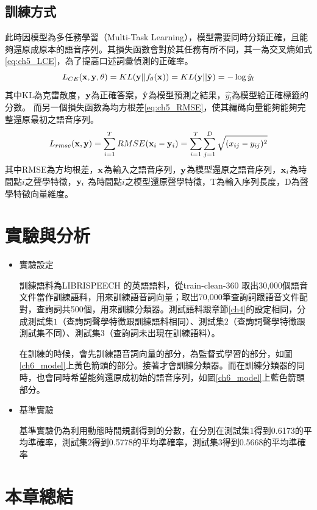\subsection{訓練方式}
此時因模型為多任務學習（Multi-Task
Learning），模型需要同時分類正確，且能夠還原成原本的語音序列。其損失函數會對於其任務有所不同，其一為交叉熵如式\ref{eq:ch5_LCE}，為了提高口述詞彙偵測的正確率。
\begin{equation}
\label{eq:ch5_LCE}
L_{CE}(\bold{x} , \bold{y} , \theta) =KL(\bold{y} || f_{\theta}(\bold{x}))= KL( \bold{y} ||\hat{\bold {y}} )  = - \log \hat{y}_{l} 
\end{equation}
其中KL為克雷散度，$\bold{y}$為正確答案，$\hat{\bold{y}}$為模型預測之結果，$\hat{y_l}$為模型給正確標籤的分數。
而另一個損失函數為均方根差\ref{eq:ch5_RMSE}，使其編碼向量能夠能夠完整還原最初之語音序列。
\begin{equation}
\label{eq:ch5_RMSE}
L_{rmse} (\bold{x},\bold{y}) = \sum_{i=1}^{T}
RMSE(\bold{x}_i-\bold{y}_i) = \sum_{i=1}^{T} \sum_{j=1}^D \sqrt{(x_{ij}-y_{ij})^2}
\end{equation}
其中RMSE為方均根差，$\bold{x}$為輸入之語音序列，$\bold{y}$為模型還原之語音序列，$\bold{x}_i$為時間點$i$之聲學特徵，$\bold{y}_i$
為時間點$i$之模型還原聲學特徵，T為輸入序列長度，D為聲學特徵向量維度。
\section{實驗與分析}
\begin{itemize}
\item{實驗設定}

	訓練語料為LIBRISPEECH 的英語語料，從train-clean-360
	取出30,000個語音文件當作訓練語料，用來訓練語音詞向量；取出70,000筆查詢詞跟語音文件配對，查詢詞共500個，用來訓練分類器。測試語料跟章節\ref{ch4}的設定相同，分成測試集$1$（查詢詞聲學特徵跟訓練語料相同）、測試集$2$（查詢詞聲學特徵跟測試集不同）、測試集$3$（查詢詞未出現在訓練語料）。
	
	在訓練的時候，會先訓練語音詞向量的部分，為監督式學習的部分，如圖\ref{ch6_model}上黃色箭頭的部分。接著才會訓練分類器。而在訓練分類器的同時，也會同時希望能夠還原成初始的語音序列，如圖\ref{ch6_model}上藍色箭頭部分。
\item{基準實驗}

	基準實驗仍為利用動態時間規劃得到的分數，在分別在測試集$1$得到0.6173的平均準確率，測試集$2$得到0.5778的平均準確率，測試集$3$得到0.5668的平均準確率
\end{itemize}
\section{本章總結}

